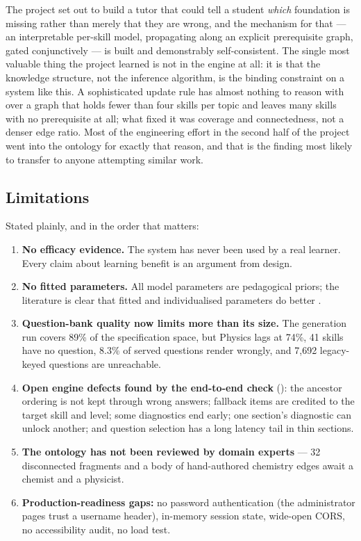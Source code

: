 The project set out to build a tutor that could tell a student \emph{which}
foundation is missing rather than merely that they are wrong, and the mechanism
for that --- an interpretable per-skill model, propagating along an explicit
prerequisite graph, gated conjunctively --- is built and demonstrably
self-consistent. The single most valuable thing the project learned is not in
the engine at all: it is that the knowledge structure, not the inference
algorithm, is the binding constraint on a system like this. A sophisticated
update rule has almost nothing to reason with over a graph that holds fewer
than four skills per topic and leaves many skills with no prerequisite at all;
what fixed it was coverage and connectedness, not a denser edge ratio. Most of the engineering effort in the second half of the project went into
the ontology for exactly that reason, and that is the finding most likely to
transfer to anyone attempting similar work.

\subsection{Limitations}

Stated plainly, and in the order that matters:

\begin{enumerate}
  \item \textbf{No efficacy evidence.} The system has never been used by a real
    learner. Every claim about learning benefit is an argument from design.
  \item \textbf{No fitted parameters.} All model parameters are pedagogical
    priors; the literature is clear that fitted and individualised parameters do
    better \cite{yudelson2013individualized,baker2008more}.
  \item \textbf{Question-bank quality now limits more than its size.} The
    generation run covers 89\% of the specification space, but Physics lags at
    74\%, 41 skills have no question, 8.3\% of served questions render wrongly,
    and 7{,}692 legacy-keyed questions are unreachable.
  \item \textbf{Open engine defects found by the end-to-end check}
    (): the ancestor ordering is not kept through wrong
    answers; fallback items are credited to the target skill and level; some
    diagnostics end early; one section's diagnostic can unlock another; and
    question selection has a long latency tail in thin sections.
  \item \textbf{The ontology has not been reviewed by domain experts} --- 32
    disconnected fragments and a body of hand-authored chemistry edges await a
    chemist and a physicist.
  \item \textbf{Production-readiness gaps:} no password authentication (the
    administrator pages trust a username header), in-memory session state,
    wide-open CORS, no accessibility audit, no load test.
\end{enumerate}

